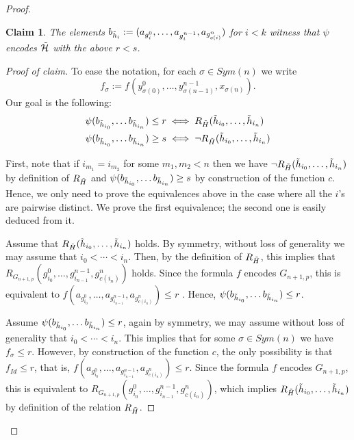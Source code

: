 \documentclass{amsart}
\newtheorem*{claim}{Claim}
\newtheorem{external claim}[teor]{Claim}
\begin{document}
\begin{proof}
            \begin{claim}
                The elements $b_{\Tilde{h}_i}:=(a_{g^0_{i}},\dots, a_{g^{n-1}_i},a_{ g^n_{c(i)} })$ for $i<k$ witness that $\psi$ encodes $\Tilde{\mathcal{H}}$ with the above $r<s$.
            \end{claim}
            \begin{proof}[Proof of claim]
                To ease the notation, for each $\sigma \in Sym(n)$ we write $$f_\sigma:=f(y^0_{\sigma(0)},\dots ,y^{n-1}_{\sigma({n-1})},x_{\sigma(n)}).$$ Our goal is the following: \begin{align*}
                    \psi( b_{\Tilde{h}_{i_0}},\dots b_{\Tilde{h}_{i_n}})\leq r &\iff R_{\Tilde{H}}(\Tilde{h}_{i_0},\dots,\Tilde{h}_{i_n})\\
                    \psi( b_{\Tilde{h}_{i_0}},\dots b_{\Tilde{h}_{i_n}})\geq s &\iff \neg R_{\Tilde{H}}(\Tilde{h}_{i_0},\dots,\Tilde{h}_{i_n})
                \end{align*}

                First, note that if $i_{m_1}=i_{m_2}$ for some $m_1,m_2<n$ then we have $\neg R_{\Tilde{H}}(\Tilde{h}_{i_0},\dots,\Tilde{h}_{i_n})$ by definition of $R_{\Tilde{H}}$ and $\psi( b_{\Tilde{h}_{i_0}},\dots b_{\Tilde{h}_{i_n}})\geq s$ by construction of the function $c$. Hence, we only need to prove the equivalences above in the case where all the $i$'s are pairwise distinct. We prove the first equivalence; the second one is easily deduced from it.
                
                Assume that $R_{\Tilde{H}}(\Tilde{h}_{i_0},\dots,\Tilde{h}_{i_n})$ holds. By symmetry, without loss of generality we may assume that $i_0<\cdots<i_n$. Then, by the definition of $R_{\Tilde{H}}$, this implies that $R_{ G_{n+1,p} }( g^0_{i_0},\dots, g^{n-1}_{i_{n-1}}, g^n_{c(i_n)}  )$ holds. Since the formula $f$ encodes $G_{n+1,p}$, this is equivalent to $f( a_{g^0_{i_0}},\dots, a_{g^{n-1}_{i_{n-1}}},a_{ g^n_{c(i_n)} } )\leq r$ . Hence, $\psi( b_{\Tilde{h}_{i_0}},\dots b_{\Tilde{h}_{i_n}})\leq r$.
                
                Assume $\psi( b_{\Tilde{h}_{i_0}},\dots b_{\Tilde{h}_{i_n}})\leq r$, again by symmetry, we may assume without loss of generality that $i_0<\cdots<i_n$. This implies that for some $\sigma\in Sym( n )$ we have $f_\sigma\leq r$. However, by construction of the function $c$, the only possibility is that $f_{Id}\leq r$, that is, $f( a_{g^0_{i_0}},\dots, a_{g^{n-1}_{i_{n-1}}},a_{ g^n_{c(i_n)} } )\leq r$.
                Since the formula $f$ encodes $G_{n+1,p}$, this is equivalent to $R_{ G_{n+1,p} }( g^0_{i_0},\dots, g^{n-1}_{i_{n-1}}, g^n_{c(i_n)}  )$, which implies $R_{\Tilde{H}}(\Tilde{h}_{i_0},\dots,\Tilde{h}_{i_n})$ by definition of the relation $R_{\Tilde{H}}$.
            \end{proof}


\end{proof}
\end{document}

